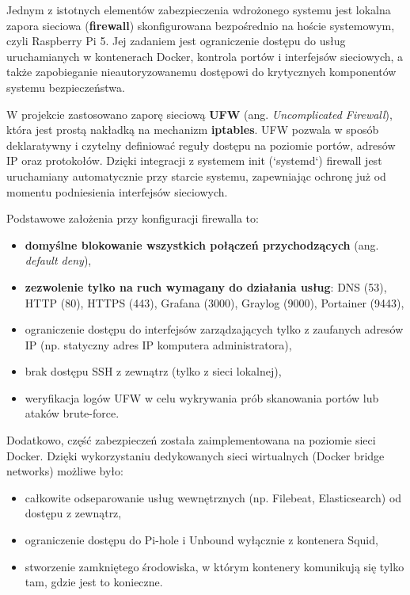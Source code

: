 \documentclass[
    left=2.5cm,         %
    right=2.5cm,        %
    top=2.5cm,          %
    bottom=3cm,         %
    bindingoffset=6mm,  %
    nohyphenation=true %
]{eiti/eiti-thesis} %
\begin{document}
Jednym z istotnych elementów zabezpieczenia wdrożonego systemu jest lokalna zapora sieciowa (\textbf{firewall}) skonfigurowana bezpośrednio na hoście systemowym, czyli Raspberry Pi 5. Jej zadaniem jest ograniczenie dostępu do usług uruchamianych w kontenerach Docker, kontrola portów i interfejsów sieciowych, a także zapobieganie nieautoryzowanemu dostępowi do krytycznych komponentów systemu bezpieczeństwa.

W projekcie zastosowano zaporę sieciową \textbf{UFW} (ang. \textit{Uncomplicated Firewall}), która jest prostą nakładką na mechanizm \textbf{iptables}. UFW pozwala w sposób deklaratywny i czytelny definiować reguły dostępu na poziomie portów, adresów IP oraz protokołów. Dzięki integracji z systemem init (`systemd`) firewall jest uruchamiany automatycznie przy starcie systemu, zapewniając ochronę już od momentu podniesienia interfejsów sieciowych.

Podstawowe założenia przy konfiguracji firewalla to:
\begin{itemize}
    \item \textbf{domyślne blokowanie wszystkich połączeń przychodzących} (ang. \textit{default deny}),
    \item \textbf{zezwolenie tylko na ruch wymagany do działania usług}: DNS (53), HTTP (80), HTTPS (443), Grafana (3000), Graylog (9000), Portainer (9443),
    \item ograniczenie dostępu do interfejsów zarządzających tylko z zaufanych adresów IP (np. statyczny adres IP komputera administratora),
    \item brak dostępu SSH z zewnątrz (tylko z sieci lokalnej),
    \item weryfikacja logów UFW w celu wykrywania prób skanowania portów lub ataków brute-force.
\end{itemize}

Dodatkowo, część zabezpieczeń została zaimplementowana na poziomie sieci Docker. Dzięki wykorzystaniu dedykowanych sieci wirtualnych (Docker bridge networks) możliwe było:
\begin{itemize}
    \item całkowite odseparowanie usług wewnętrznych (np. Filebeat, Elasticsearch) od dostępu z zewnątrz,
    \item ograniczenie dostępu do Pi-hole i Unbound wyłącznie z kontenera Squid,
    \item stworzenie zamkniętego środowiska, w którym kontenery komunikują się tylko tam, gdzie jest to konieczne.
\end{itemize}
\end{document}
